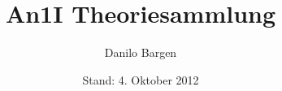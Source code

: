 


\subject{Analysis 1 für Informatiker}
\title{An1I Theoriesammlung}
\author{Danilo Bargen}
\date{Stand: 4. Oktober 2012}















